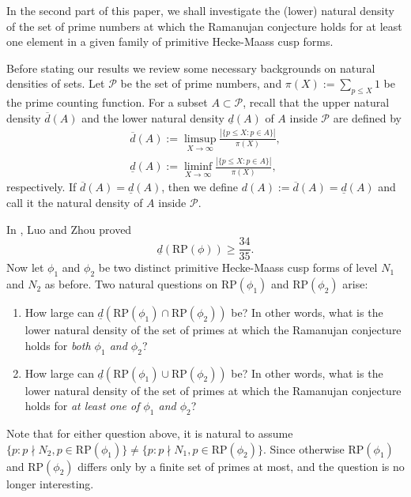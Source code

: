 \documentclass[10pt,leqno]{amsart}
\theoremstyle{plain}
\theoremstyle{definition}
\theoremstyle{remark}
\numberwithin{equation}{section}
\newcommand{\RP}{\text{RP}}
\newcommand{\cP}{\mathcal{P}}
\begin{document}
In the second part of this paper, we shall investigate the (lower) natural density of the set of prime numbers at which the Ramanujan conjecture holds for at least one element in a given family of primitive Hecke-Maass cusp forms. 

Before stating our results we review some necessary backgrounds on natural densities of sets.
Let $\mathcal{P}$ be the set of prime numbers, and $\pi(X) := \sum_{p \leq X} 1$ be the prime counting function. For a subset $A \subset \cP$, recall that the upper natural density $\overline{d}(A)$ and the lower natural density $\underline{d}(A)$ of $A$ inside $\cP$ are defined by 
\begin{align*}
    \overline{d}(A) := \limsup_{X \to \infty} \frac{|\{p \leq X:p \in A\}|}{\pi(X)}, \\
    \underline{d}(A) := \liminf_{X \to \infty} \frac{|\{p \leq X:p \in A\}|}{\pi(X)},
\end{align*}
respectively. If $\overline{d}(A) = \underline{d}(A)$, then we define $d(A) := \overline{d}(A) = \underline{d}(A)$ and call it the natural density of $A$ inside $\cP$.

  In \cite[Theorem 1.2]{LuoZhouMR3928043}, Luo and Zhou proved
\begin{equation}\label{density result single form}
    \underline{d}(\RP(\phi)) \geq \frac{34}{35}.
\end{equation}
Now let $\phi_1$ and $\phi_2$ be two distinct primitive Hecke-Maass cusp forms of level $N_1$ and $N_2$ as before. Two natural questions on $\RP(\phi_1)$ and $\RP(\phi_2)$ arise:
\begin{enumerate}
    \item How large can $\underline{d}(\RP(\phi_1) \cap \RP(\phi_2))$ be? In other words, what is the lower natural density of the set of primes at which the Ramanujan conjecture holds for \textit{both $\phi_1$ and $\phi_2$}?
    \item How large can $\underline{d}(\RP(\phi_1) \cup \RP(\phi_2))$ be? In other words, what is the lower natural density of the set of primes at which the Ramanujan conjecture holds for \textit{at least one of $\phi_1$ and $\phi_2$}?
\end{enumerate}

Note that for either question above, it is natural to assume $\{p:p \nmid N_2,p \in \RP(\phi_1)\} \neq \{p:p \nmid N_1, p \in \RP(\phi_2)\}$. Since otherwise $\RP(\phi_1)$ and $\RP(\phi_2)$ differs only by a finite set of primes at most, and the question is no longer interesting.
\end{document}
